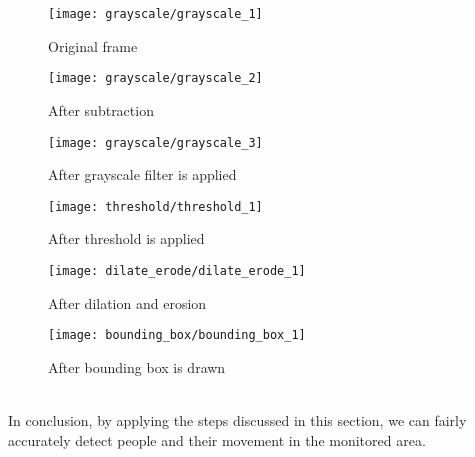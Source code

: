 	\begin{figure}[ht]
		\begin{minipage}[b]{0.50 \linewidth}
		\centering
		\texttt{[image: grayscale/grayscale\_1]}
		\caption{Original frame}
		\end{minipage}
		\begin{minipage}[b]{0.50 \linewidth}
		\centering
		\texttt{[image: grayscale/grayscale\_2]}
		\caption{After subtraction}
		\end{minipage}
		\begin{minipage}[b]{0.50 \linewidth}
		\centering
		\texttt{[image: grayscale/grayscale\_3]}
		\caption{After grayscale filter is applied}
		\end{minipage}
		\begin{minipage}[b]{0.50 \linewidth}
		\centering
		\texttt{[image: threshold/threshold\_1]}
		\caption{After threshold is applied}
		\end{minipage}
		\begin{minipage}[b]{0.50 \linewidth}
		\centering
		\texttt{[image: dilate\_erode/dilate\_erode\_1]}
		\caption{After dilation and erosion}
		\end{minipage}
		\begin{minipage}[b]{0.50 \linewidth}
		\centering
		\texttt{[image: bounding\_box/bounding\_box\_1]}
		\caption{After bounding box is drawn}
		\end{minipage}
	\end{figure}
	\\In conclusion, by applying the steps discussed in this section, we can fairly accurately detect people and their movement in the monitored area.
	
